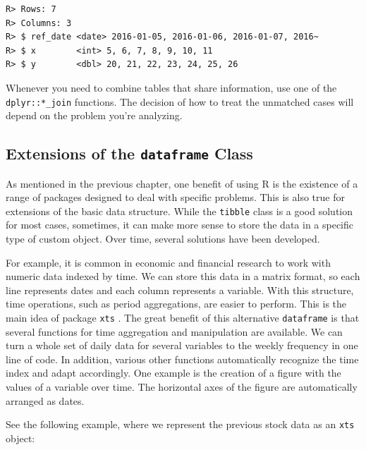 \documentclass[
  12pt,
]{book}
\begin{document}
\begin{verbatim}
R> Rows: 7
R> Columns: 3
R> $ ref_date <date> 2016-01-05, 2016-01-06, 2016-01-07, 2016~
R> $ x        <int> 5, 6, 7, 8, 9, 10, 11
R> $ y        <dbl> 20, 21, 22, 23, 24, 25, 26
\end{verbatim}

Whenever you need to combine tables that share information, use one of the \texttt{dplyr::*\_join} functions. The decision of how to treat the unmatched cases will depend on the problem you're analyzing.

\hypertarget{extensions-of-the-dataframe-class}{%
\subsection{\texorpdfstring{Extensions of the \texttt{dataframe} Class}{Extensions of the dataframe Class}}\label{extensions-of-the-dataframe-class}}

As mentioned in the previous chapter, one benefit of using R is the existence of a range of packages designed to deal with specific problems. This is also true for extensions of the basic data structure. While the \texttt{tibble} class is a good solution for most cases, sometimes, it can make more sense to store the data in a specific type of custom object. Over time, several solutions have been developed.

For example, it is common in economic and financial research to work with numeric data indexed by time. We can store this data in a matrix format, so each line represents dates and each column represents a variable. With this structure, time operations, such as period aggregations, are easier to perform. This is the main idea of package \texttt{xts} \citep{R-xts}. The great benefit of this alternative \texttt{dataframe} is that several functions for time aggregation and manipulation are available. We can turn a whole set of daily data for several variables to the weekly frequency in one line of code. In addition, various other functions automatically recognize the time index and adapt accordingly. One example is the creation of a figure with the values of a variable over time. The horizontal axes of the figure are automatically arranged as dates. 

See the following example, where we represent the previous stock data as an \texttt{xts} object: 
\end{document}
